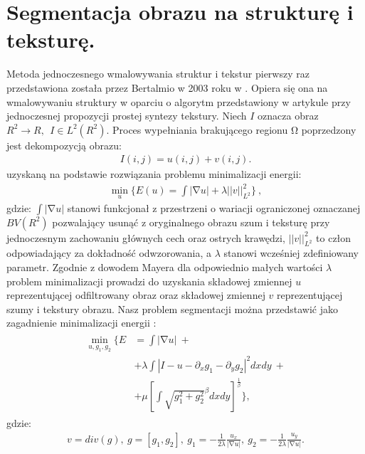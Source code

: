 \documentclass[a4paper,12pt,twoside,openany]{report}
\begin{document}
\section{Segmentacja obrazu na strukturę i teksturę.}\label{sec:StructureTextureNavierStokes}
Metoda jednoczesnego wmalowywania struktur i tekstur pierwszy raz przedstawiona została przez Bertalmio w 2003 roku w \cite{NavierStokesAndTexturePropagation}. Opiera się ona na wmalowywaniu struktury w oparciu o algorytm przedstawiony w artykule przy jednoczesnej propozycji prostej syntezy tekstury. Niech $I$ oznacza obraz $R^2\to R,\ \ I\in L^2(R^2)$. Proces wypełniania brakującego regionu $\mathrm{\Omega }$ poprzedzony jest dekompozycją obrazu:
\begin{align}
I\left(i,j\right)=u\left(i,j\right)+v\left(i,j\right).
\label{STRUCTURETEXTURE1}
\end{align}
uzyskaną na podstawie rozwiązania problemu minimalizacji energii:
\begin{align} 
{\mathop{\mathrm{min}}_{u} \Biggl\{E\left(u\right)=\int{\left|\mathrm{\nabla }u\right|+\lambda {\left|\left|v\right|\right|}^2_{L^2}}\Biggr\}\ },
\label{STRUCTURETEXTURE2}
\end{align}
gdzie: $\int{\left|\mathrm{\nabla }u\right|}$ stanowi funkcjonał z przestrzeni o wariacji ograniczonej oznaczanej $BV(R^2)$ pozwalający usunąć z oryginalnego obrazu szum i teksturę przy jednoczesnym zachowaniu głównych cech oraz ostrych krawędzi, ${\left|\left|v\right|\right|}^2_{L^2}$ to człon odpowiadający za dokładność odwzorowania, a $\lambda $ stanowi wcześniej zdefiniowany parametr. Zgodnie z dowodem Mayera \cite{meyer2001oscillating} dla odpowiednio małych wartości $\lambda $ problem minimalizacji prowadzi do uzyskania składowej zmiennej $u$ reprezentującej odfiltrowany obraz oraz składowej zmiennej $v$ reprezentującej szumy i tekstury obrazu. Nasz problem segmentacji można przedstawić jako zagadnienie minimalizacji energii \cite{vese2003modeling}:
\begin{align}
\begin{aligned} 
\mathop{\mathrm{min}}_{u,g_1,g_2} \Biggl\{E &= \int{\left|\mathrm{\nabla }u\right| } \ + \\
&+\lambda \int{\left|I-u-\partial_x g_1- \partial_y g_2 \right|}^2dxdy \ +\\
&+ \mu {\left[\int{{\sqrt{g^2_1+g^2_2}}^\beta dxdy}\right]}^{\frac{1}{\beta}}\Biggr\},
\end{aligned}
\end{align}
gdzie:
\begin{align}
v=div(g),\ g=\left[ g_1,g_2 \right],\ g_1=-\frac{1}{2\lambda }\frac{u_x}{\left|\mathrm{\nabla }u\right|},\ g_2=-\frac{1}{2\lambda }\frac{u_y}{\left|\mathrm{\nabla }u\right|}.
\label{VG1G2}
\end{align}
\end{document}
